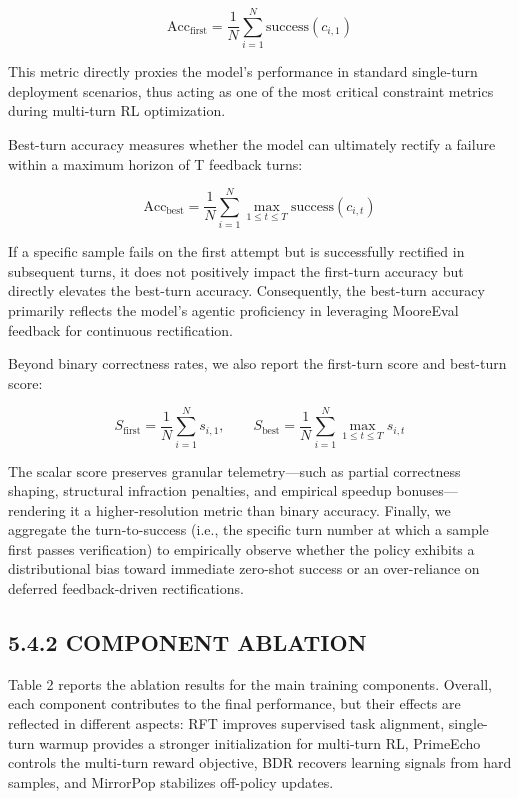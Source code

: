 \documentclass[
  10
]{article}
\begin{document}
\[
\mathrm{Acc} _ {\mathrm{first}} = \frac {1}{N} \sum_ {i = 1} ^ {N} \mathrm{success} (c _ {i, 1})\tag{23}
\]

This metric directly proxies the model's performance in standard
single-turn deployment scenarios, thus acting as one of the most
critical constraint metrics during multi-turn RL optimization.

Best-turn accuracy measures whether the model can ultimately rectify a
failure within a maximum horizon of T feedback turns:

\[
\mathrm{Acc} _ {\mathrm{best}} = \frac {1}{N} \sum_ {i = 1} ^ {N} \max _ {1 \leq t \leq T} \mathrm{success} (c _ {i, t})\tag{24}
\]

If a specific sample fails on the first attempt but is successfully
rectified in subsequent turns, it does not positively impact the
first-turn accuracy but directly elevates the best-turn accuracy.
Consequently, the best-turn accuracy primarily reflects the model's
agentic proficiency in leveraging MooreEval feedback for continuous
rectification.

Beyond binary correctness rates, we also report the first-turn score and
best-turn score:

\[
S _ {\mathrm{first}} = \frac {1}{N} \sum_ {i = 1} ^ {N} s _ {i, 1}, \qquad S _ {\mathrm{best}} = \frac {1}{N} \sum_ {i = 1} ^ {N} \max _ {1 \leq t \leq T} s _ {i, t}\tag{25}
\]

The scalar score preserves granular telemetry---such as partial
correctness shaping, structural infraction penalties, and empirical
speedup bonuses---rendering it a higher-resolution metric than binary
accuracy. Finally, we aggregate the turn-to-success (i.e., the specific
turn number at which a sample first passes verification) to empirically
observe whether the policy exhibits a distributional bias toward
immediate zero-shot success or an over-reliance on deferred
feedback-driven rectifications.

\subsection{5.4.2 COMPONENT ABLATION}\label{component-ablation}

Table 2 reports the ablation results for the main training components.
Overall, each component contributes to the final performance, but their
effects are reflected in different aspects: RFT improves supervised task
alignment, single-turn warmup provides a stronger initialization for
multi-turn RL, PrimeEcho controls the multi-turn reward objective, BDR
recovers learning signals from hard samples, and MirrorPop stabilizes
off-policy updates.
\end{document}
